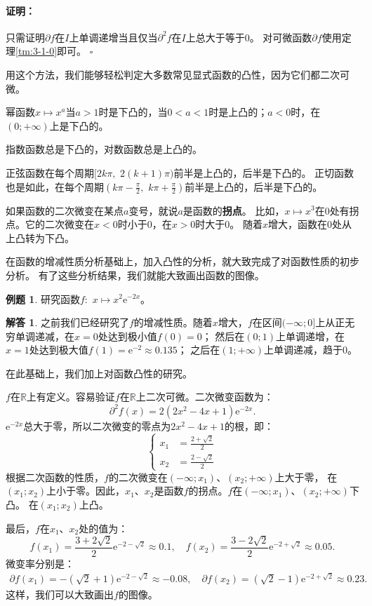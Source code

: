 \documentclass[12pt,UTF8]{ctexbook}
\theoremstyle{definition}
\newtheorem{et}{例题}[section]
\newtheorem*{so}{解答}
\theoremstyle{plain}
\renewenvironment{proof}{\paragraph{\textbf{证明：}}}{\hfill$\square$}
\begin{document}
\begin{proof}
    只需证明$\partial f$在$I$上单调递增当且仅当$\partial^2 f$在$I$上总大于等于$0$。
    对可微函数$\partial f$使用定理\ref{tm:3-1-0}即可。
\end{proof}

用这个方法，我们能够轻松判定大多数常见显式函数的凸性，因为它们都二次可微。

幂函数$x\mapsto x^a$当$a>1$时是下凸的，当$0<a<1$时是上凸的；$a<0$时，在$(0;+\infty)$上是下凸的。

指数函数总是下凸的，对数函数总是上凸的。

正弦函数在每个周期$[2k\pi, \,\, 2(k+1)\pi)$前半是上凸的，后半是下凸的。
正切函数也是如此，在每个周期$(k\pi-\frac{\pi}{2}, \,\, k\pi+\frac{\pi}{2})$前半是上凸的，后半是下凸的。

如果函数的二次微变在某点$a$变号，就说$a$是函数的\textbf{拐点}。
比如，$x\mapsto x^3$在$0$处有拐点。它的二次微变在$x<0$时小于$0$，在$x>0$时大于$0$。
随着$x$增大，函数在$0$处从上凸转为下凸。

在函数的增减性质分析基础上，加入凸性的分析，就大致完成了对函数性质的初步分析。
有了这些分析结果，我们就能大致画出函数的图像。

\begin{et}
    研究函数$f:\,\,x\mapsto x^2 \mathrm{e}^{-2x}$。
\end{et}

\begin{so}

    之前我们已经研究了$f$的增减性质。随着$x$增大，$f$在区间$(-\infty; 0]$上从正无穷单调递减，在$x = 0$处达到极小值$f(0) = 0$；
    然后在$(0; 1)$上单调递增，在$x = 1$处达到极大值$f(1) = \mathrm{e}^{-2} \approx 0.135$；
    之后在$(1; +\infty)$上单调递减，趋于$0$。

    在此基础上，我们加上对函数凸性的研究。

    $f$在$\mathbb{R}$上有定义。容易验证$f$在$\mathbb{R}$上二次可微。二次微变函数为：
    $$ \partial^2 f (x) = 2(2x^2 - 4x + 1)\mathrm{e}^{-2x}.$$
    $\mathrm{e}^{-2x}$总大于零，所以二次微变的零点为$2x^2 - 4x + 1$的根，即：
    $$  
        \left\{ 
            \begin{array}{cl}
                x_1 &= \frac{2 + \sqrt{2}}{2} \\
                x_2 &= \frac{2 - \sqrt{2}}{2} 
            \end{array}
        \right.
    $$
    根据二次函数的性质，$f$的二次微变在$(-\infty; x_1)$、$(x_2; +\infty)$上大于零，
    在$(x_1; x_2)$上小于零。因此，$x_1$、$x_2$是函数$f$的拐点。$f$在$(-\infty; x_1)$、$(x_2; +\infty)$下凸。
    在$(x_1; x_2)$上凸。

    最后，$f$在$x_1$、$x_2$处的值为：
    $$ f(x_1) = \frac{3 + 2\sqrt{2}}{2} \mathrm{e}^{-2-\sqrt{2}} \approx 0.1, \quad f(x_2) = \frac{3 - 2\sqrt{2}}{2} \mathrm{e}^{-2+\sqrt{2}} \approx 0.05. $$
    微变率分别是：
    \begin{align*}
        \partial f(x_1) = -(\sqrt{2} + 1)\mathrm{e}^{-2-\sqrt{2}} \approx -0.08, \quad  \partial f(x_2) = (\sqrt{2} - 1)\mathrm{e}^{-2+\sqrt{2}} \approx 0.23. 
    \end{align*}
    这样，我们可以大致画出$f$的图像。
\end{so}
\end{document}
